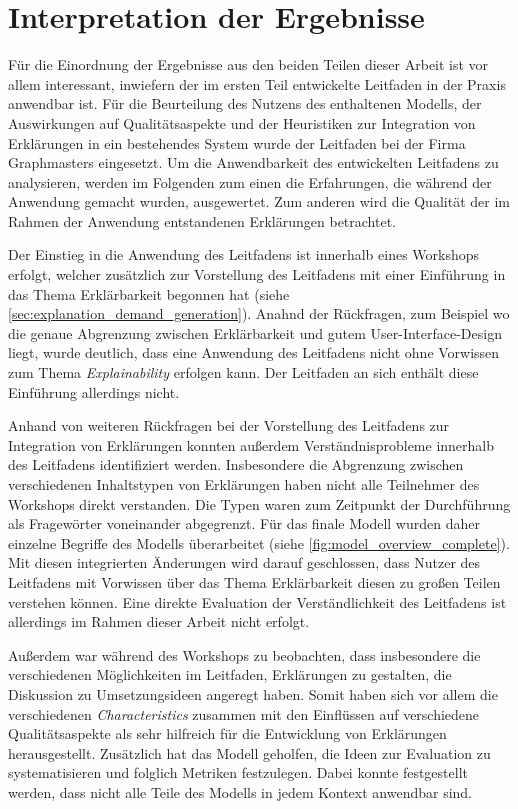 \section{Interpretation der Ergebnisse}

Für die Einordnung der Ergebnisse aus den beiden Teilen dieser Arbeit ist vor allem interessant, inwiefern der im ersten Teil entwickelte Leitfaden in der Praxis anwendbar ist. Für die Beurteilung des Nutzens des enthaltenen Modells, der Auswirkungen auf Qualitätsaspekte und der Heuristiken zur Integration von Erklärungen in ein bestehendes System wurde der Leitfaden bei der Firma Graphmasters eingesetzt. Um die Anwendbarkeit des entwickelten Leitfadens zu analysieren, werden im Folgenden zum einen die Erfahrungen, die während der Anwendung gemacht wurden, ausgewertet. Zum anderen wird die Qualität der im Rahmen der Anwendung entstandenen Erklärungen betrachtet.

Der Einstieg in die Anwendung des Leitfadens ist innerhalb eines Workshops erfolgt, welcher zusätzlich zur Vorstellung des Leitfadens mit einer Einführung in das Thema Erklärbarkeit begonnen hat (siehe \autoref{sec:explanation_demand_generation}). Anahnd der Rückfragen, zum Beispiel wo die genaue Abgrenzung zwischen Erklärbarkeit und gutem User-Interface-Design liegt, wurde deutlich, dass eine Anwendung des Leitfadens nicht ohne Vorwissen zum Thema \textit{Explainability} erfolgen kann. Der Leitfaden an sich enthält diese Einführung allerdings nicht.

Anhand von weiteren Rückfragen bei der Vorstellung des Leitfadens zur Integration von Erklärungen konnten außerdem Verständnisprobleme innerhalb des Leitfadens identifiziert werden. Insbesondere die Abgrenzung zwischen verschiedenen Inhaltstypen von Erklärungen haben nicht alle Teilnehmer des Workshops direkt verstanden. Die Typen waren zum Zeitpunkt der Durchführung als Fragewörter voneinander abgegrenzt. Für das finale Modell wurden daher einzelne Begriffe des Modells überarbeitet (siehe \autoref{fig:model_overview_complete}). Mit diesen integrierten Änderungen wird darauf geschlossen, dass Nutzer des Leitfadens mit Vorwissen über das Thema Erklärbarkeit diesen zu großen Teilen verstehen können. Eine direkte Evaluation der Verständlichkeit des Leitfadens ist allerdings im Rahmen dieser Arbeit nicht erfolgt.

Außerdem war während des Workshops zu beobachten, dass insbesondere die verschiedenen Möglichkeiten im Leitfaden, Erklärungen zu gestalten, die Diskussion zu Umsetzungsideen angeregt haben. Somit haben sich vor allem die verschiedenen \textit{Characteristics} zusammen mit den Einflüssen auf verschiedene Qualitätsaspekte als sehr hilfreich für die Entwicklung von Erklärungen herausgestellt. Zusätzlich hat das Modell geholfen, die Ideen zur Evaluation zu systematisieren und folglich Metriken festzulegen. Dabei konnte festgestellt werden, dass nicht alle Teile des Modells in jedem Kontext anwendbar sind.

